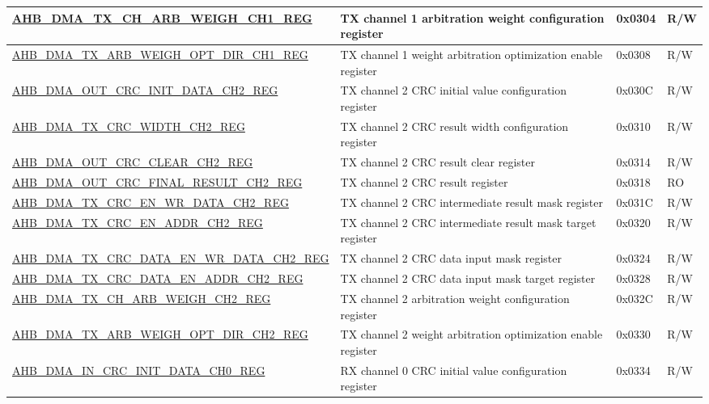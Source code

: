 \begin{longtable}{ | l | p{10cm} | p{1.3cm} | l | }
\hyperref[regdesc:AHBDMATXCHARBWEIGHCHNREG]{AHB\_DMA\_TX\_CH\_ARB\_WEIGH\_CH1\_REG} & TX channel 1 arbitration weight configuration register & 0x0304 & R/W \\ \hline
\hyperref[regdesc:AHBDMATXARBWEIGHOPTDIRCHNREG]{AHB\_DMA\_TX\_ARB\_WEIGH\_OPT\_DIR\_CH1\_REG} & TX channel 1 weight arbitration optimization enable register & 0x0308 & R/W \\ \hline
\hyperref[regdesc:AHBDMAOUTCRCINITDATACHNREG]{AHB\_DMA\_OUT\_CRC\_INIT\_DATA\_CH2\_REG} & TX channel 2 CRC initial value configuration register & 0x030C & R/W \\ \hline
\hyperref[regdesc:AHBDMATXCRCWIDTHCHNREG]{AHB\_DMA\_TX\_CRC\_WIDTH\_CH2\_REG} & TX channel 2 CRC result width configuration register & 0x0310 & R/W \\ \hline
\hyperref[regdesc:AHBDMAOUTCRCCLEARCHNREG]{AHB\_DMA\_OUT\_CRC\_CLEAR\_CH2\_REG} & TX channel 2 CRC result clear register & 0x0314 & R/W \\ \hline
\hyperref[regdesc:AHBDMAOUTCRCFINALRESULTCHNREG]{AHB\_DMA\_OUT\_CRC\_FINAL\_RESULT\_CH2\_REG} & TX channel 2 CRC result register & 0x0318 & RO \\ \hline
\hyperref[regdesc:AHBDMATXCRCENWRDATACHNREG]{AHB\_DMA\_TX\_CRC\_EN\_WR\_DATA\_CH2\_REG} & TX channel 2 CRC intermediate result mask register & 0x031C & R/W \\ \hline
\hyperref[regdesc:AHBDMATXCRCENADDRCHNREG]{AHB\_DMA\_TX\_CRC\_EN\_ADDR\_CH2\_REG} & TX channel 2 CRC intermediate result mask target register & 0x0320 & R/W \\ \hline
\hyperref[regdesc:AHBDMATXCRCDATAENWRDATACHNREG]{AHB\_DMA\_TX\_CRC\_DATA\_EN\_WR\_DATA\_CH2\_REG} & TX channel 2 CRC data input mask register & 0x0324 & R/W \\ \hline
\hyperref[regdesc:AHBDMATXCRCDATAENADDRCHNREG]{AHB\_DMA\_TX\_CRC\_DATA\_EN\_ADDR\_CH2\_REG} & TX channel 2 CRC data input mask target register & 0x0328 & R/W \\ \hline
\hyperref[regdesc:AHBDMATXCHARBWEIGHCHNREG]{AHB\_DMA\_TX\_CH\_ARB\_WEIGH\_CH2\_REG} & TX channel 2 arbitration weight configuration register & 0x032C & R/W \\ \hline
\hyperref[regdesc:AHBDMATXARBWEIGHOPTDIRCHNREG]{AHB\_DMA\_TX\_ARB\_WEIGH\_OPT\_DIR\_CH2\_REG} & TX channel 2 weight arbitration optimization enable register & 0x0330 & R/W \\ \hline
\hyperref[regdesc:AHBDMAINCRCINITDATACHNREG]{AHB\_DMA\_IN\_CRC\_INIT\_DATA\_CH0\_REG} & RX channel 0 CRC initial value configuration register & 0x0334 & R/W \\ \hline

\end{longtable}
